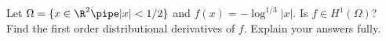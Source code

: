 Let $\Omega=\{x\in \R^2 \pipe |x|<1/2\}$ and $f(x)=-\log^{1/3}|x|$. Is
$f\in H^1(\Omega)$? Find the first order distributional derivatives of
$f$. Explain your answers fully.
